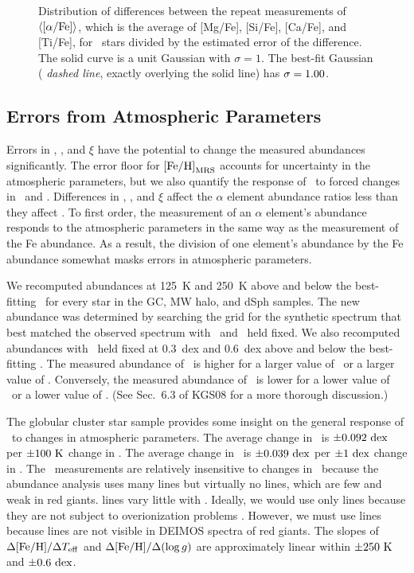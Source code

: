 \documentclass{emulateapj}
\begin{document}
\begin{figure}[t!]
\begin{minipage}[t]{0.4\textwidth}
\caption{Distribution of differences between the repeat measurements
  of $\langle[\alpha/\rm{Fe}]\rangle$, which is the average of
  [Mg/Fe], [Si/Fe], [Ca/Fe], and [Ti/Fe], for \nalphadup\ stars
  divided by the estimated error of the difference.  The solid curve
  is a unit Gaussian with $\sigma = 1$.  The best-fit Gaussian ({\it
    dashed line}, exactly overlying the solid line) has $\sigma =
  1.00$.\label{fig:alphadup}}
\end{minipage}
\end{figure}

\subsection{Errors from Atmospheric Parameters}
\label{sec:atmerr}

Errors in \teff, \logg, and $\xi$ have the potential to change the
measured abundances significantly.  The error floor for ${\rm [Fe/H]}_{\rm
  MRS}$ accounts for uncertainty in the atmospheric parameters, but we
also quantify the response of \feh\ to forced changes in \teff\ and
\logg.  Differences in \teff, \logg, and $\xi$ affect the $\alpha$
element abundance ratios less than they affect \feh.  To first order,
the measurement of an $\alpha$ element's abundance responds to the
atmospheric parameters in the same way as the measurement of the Fe
abundance.  As a result, the division of one element's abundance by
the Fe abundance somewhat masks errors in atmospheric parameters.

We recomputed abundances at 125~K and 250~K above and below the
best-fitting \teff\ for every star in the GC, MW halo, and dSph
samples.  The new abundance was determined by searching the grid for
the synthetic spectrum that best matched the observed spectrum with
\teff\ and \logg\ held fixed.  We also recomputed abundances with
\logg\ held fixed at 0.3~dex and 0.6~dex above and below the
best-fitting \logg.  The measured abundance of \feh\ is higher for a
larger value of \teff\ or a larger value of \logg.  Conversely, the
measured abundance of \feh\ is lower for a lower value of \teff\ or a
lower value of \logg.  (See Sec.~6.3 of KGS08 for a more thorough
discussion.)

The globular cluster star sample provides some insight on the general
response of \feh\ to changes in atmospheric parameters.  The average
change in \feh\ is $\pm 0.092~{\rm dex}$ per $\pm 100~{\rm K}$ change
in \teff.  The average change in \feh\ is $\pm 0.039~{\rm dex}$ per
$\pm 1~{\rm dex}$ change in \logg.  The \feh\ measurements are
relatively insensitive to changes in \logg\ because the abundance
analysis uses many  lines but virtually no 
lines, which are few and weak in red giants.   lines vary
little with \logg.  Ideally, we would use only  lines
because they are not subject to overionization problems
\citep{the99,iva01}.  However, we must use  lines because
 lines are not visible in DEIMOS spectra of red giants.
The slopes of $\Delta {\rm [Fe/H]} / \Delta T_{\rm eff}$ and $\Delta
{\rm [Fe/H]} / \Delta (\log g)$ are approximately linear within $\pm
250~{\rm K}$ and $\pm 0.6~{\rm dex}$.
\end{document}
